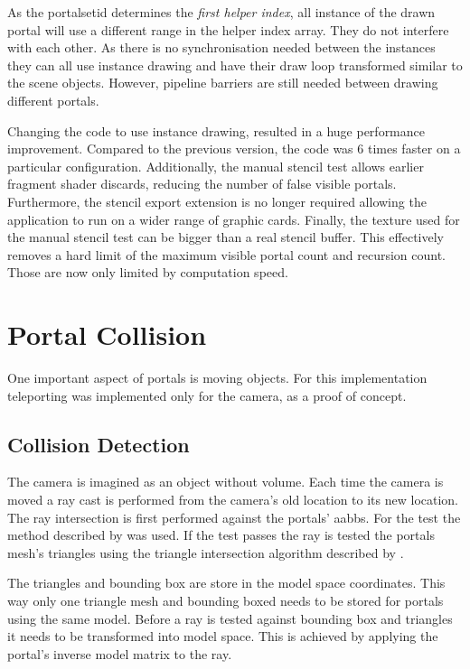 As the \gls{portalsetid} determines the \textit{first helper index}, all instance of the drawn portal will use a different range in the helper index array. They do not interfere with each other. As there is no synchronisation needed between the instances they can all use instance drawing and have their draw loop transformed similar to the scene objects. However, pipeline barriers are still needed between drawing different portals.

Changing the code to use instance drawing, resulted in a huge performance improvement. Compared to the previous version, the code was 6 times faster on a particular configuration. Additionally, the manual stencil test allows earlier fragment shader discards, reducing the number of false visible portals. Furthermore, the stencil export extension is no longer required allowing the application to run on a wider range of graphic cards. Finally, the texture used for the manual stencil test can be bigger than a real stencil buffer. This effectively removes a hard limit of the maximum visible portal count and recursion count. Those are now only limited by computation speed.


\section{Portal Collision}
One important aspect of portals is moving objects. For this implementation teleporting was implemented only for the camera, as a proof of concept.

\subsection{Collision Detection}
The camera is imagined as an object without volume. Each time the camera is moved a ray cast is performed from the camera's old location to its new location. The ray intersection is first performed against the portals' \glspl{aabb}. For the test the method described by \textcite{williams:2005:efficient} was used. If the test passes the ray is tested the portals mesh's triangles using the triangle intersection algorithm described by \textcite{moller:2005:fast}.


The triangles and bounding box are store in the model space coordinates. This way only one triangle mesh and bounding boxed needs to be stored for portals using the same model. Before a ray is tested against bounding box and triangles it needs to be transformed into model space. This is achieved by applying the portal's inverse model matrix to the ray.

